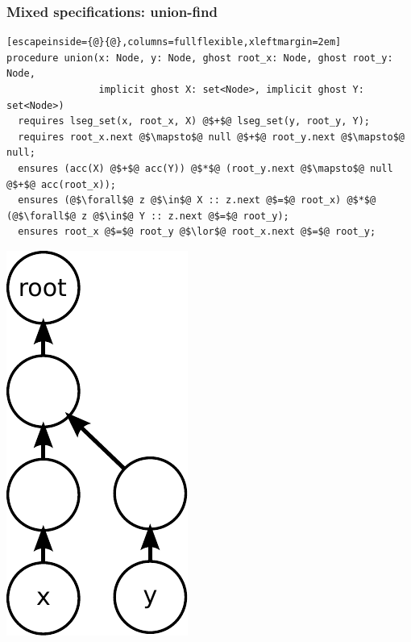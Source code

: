 \documentclass{beamer}
\begin{document}
\begin{frame}[fragile]
  \frametitle{Mixed specifications: union-find}
\begin{lstlisting}[escapeinside={@}{@},columns=fullflexible,xleftmargin=2em]
procedure union(x: Node, y: Node, ghost root_x: Node, ghost root_y: Node,
                implicit ghost X: set<Node>, implicit ghost Y: set<Node>)
  requires lseg_set(x, root_x, X) @$+$@ lseg_set(y, root_y, Y);
  requires root_x.next @$\mapsto$@ null @$+$@ root_y.next @$\mapsto$@ null;
  ensures (acc(X) @$+$@ acc(Y)) @$*$@ (root_y.next @$\mapsto$@ null @$+$@ acc(root_x));
  ensures (@$\forall$@ z @$\in$@ X :: z.next @$=$@ root_x) @$*$@ (@$\forall$@ z @$\in$@ Y :: z.next @$=$@ root_y);
  ensures root_x @$=$@ root_y @$\lor$@ root_x.next @$=$@ root_y;
\end{lstlisting}
  
  \begin{center}
  \includegraphics[scale=0.5]{resources/uf2.pdf}
  \end{center}
\end{frame}

\section{\Tool}
\end{document}
